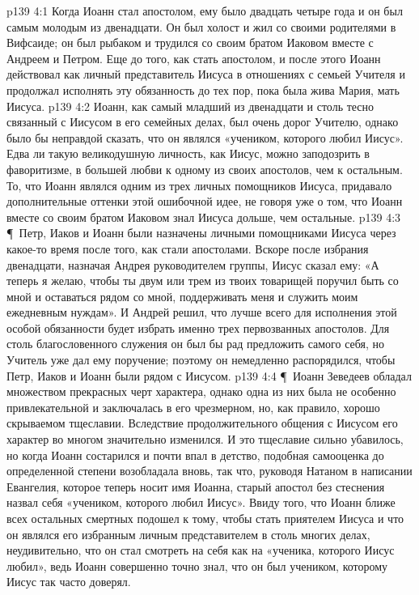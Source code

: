 \vs p139 4:1 Когда Иоанн стал апостолом, ему было двадцать четыре года и он был самым молодым из двенадцати. Он был холост и жил со своими родителями в Вифсаиде; он был рыбаком и трудился со своим братом Иаковом вместе с Андреем и Петром. Еще до того, как стать апостолом, и после этого Иоанн действовал как личный представитель Иисуса в отношениях с семьей Учителя и продолжал исполнять эту обязанность до тех пор, пока была жива Мария, мать Иисуса.
\vs p139 4:2 Иоанн, как самый младший из двенадцати и столь тесно связанный с Иисусом в его семейных делах, был очень дорог Учителю, однако было бы неправдой сказать, что он являлся «учеником, которого любил Иисус». Едва ли такую великодушную личность, как Иисус, можно заподозрить в фаворитизме, в большей любви к одному из своих апостолов, чем к остальным. То, что Иоанн являлся одним из трех личных помощников Иисуса, придавало дополнительные оттенки этой ошибочной идее, не говоря уже о том, что Иоанн вместе со своим братом Иаковом знал Иисуса дольше, чем остальные.
\vs p139 4:3 \P\ Петр, Иаков и Иоанн были назначены личными помощниками Иисуса через какое\hyp{}то время после того, как стали апостолами. Вскоре после избрания двенадцати, назначая Андрея руководителем группы, Иисус сказал ему: «А теперь я желаю, чтобы ты двум или трем из твоих товарищей поручил быть со мной и оставаться рядом со мной, поддерживать меня и служить моим ежедневным нуждам». И Андрей решил, что лучше всего для исполнения этой особой обязанности будет избрать именно трех первозванных апостолов. Для столь благословенного служения он был бы рад предложить самого себя, но Учитель уже дал ему поручение; поэтому он немедленно распорядился, чтобы Петр, Иаков и Иоанн были рядом с Иисусом.
\vs p139 4:4 \P\ Иоанн Зеведеев обладал множеством прекрасных черт характера, однако одна из них была не особенно привлекательной и заключалась в его чрезмерном, но, как правило, хорошо скрываемом тщеславии. Вследствие продолжительного общения с Иисусом его характер во многом значительно изменился. И это тщеславие сильно убавилось, но когда Иоанн состарился и почти впал в детство, подобная самооценка до определенной степени возобладала вновь, так что, руководя Натаном в написании Евангелия, которое теперь носит имя Иоанна, старый апостол без стеснения назвал себя «учеником, которого любил Иисус». Ввиду того, что Иоанн ближе всех остальных смертных подошел к тому, чтобы стать приятелем Иисуса и что он являлся его избранным личным представителем в столь многих делах, неудивительно, что он стал смотреть на себя как на «ученика, которого Иисус любил», ведь Иоанн совершенно точно знал, что он был учеником, которому Иисус так часто доверял.
